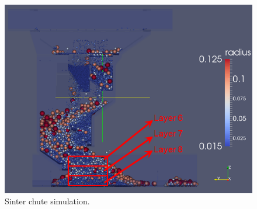 \begin{figure}[!htb]
\centering
\includegraphics[width=.80\columnwidth]{images/067sinterchute}
\caption[Sinter chute simulation]{Sinter chute simulation.}
\label{fig:067sinterchute}
\end{figure}